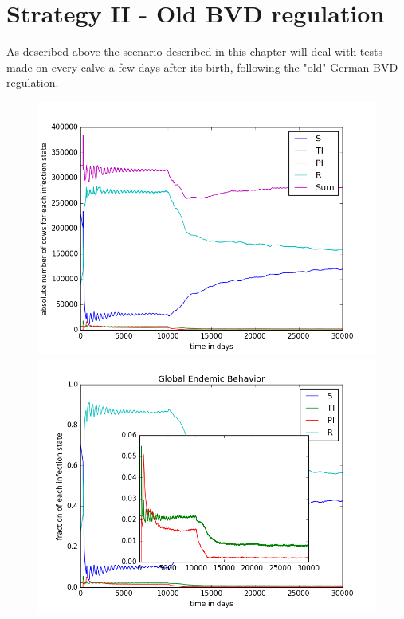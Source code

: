 \section{Strategy II - Old BVD regulation}
As described above the scenario described in this chapter will deal with tests made on every calve a few days after its birth, following the "old" German BVD regulation.
\begin{figure}[htbp]
\begin{minipage}{0.5\textwidth}
\centering
\noindent\includegraphics[width=0.95\linewidth,height=\textheight,
keepaspectratio]{cont2totalEndemicNumbers.png} 
\end{minipage}
\begin{minipage}{0.5\textwidth}
\centering
\noindent\includegraphics[width=0.95\linewidth,height=\textheight,
keepaspectratio]{cont2endemicFractions.png} 
\end{minipage}
\caption[Endemic Behavior in Containment Strategy One]{}
\label{fig:demographyScen8}
\end{figure}


